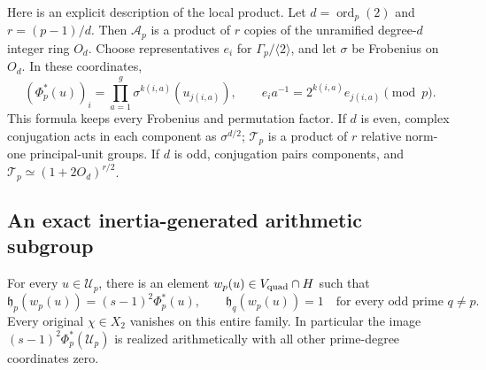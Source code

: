 Here is an explicit description of the local product.
Let \(d=\operatorname{ord}_p(2)\) and \(r=(p-1)/d\).
Then \(\mathcal A_p\) is a product of \(r\) copies of
the unramified degree-\(d\) integer ring \(O_d\).
Choose representatives \(e_i\) for
\(\Gamma_p/\langle2\rangle\), and let \(\sigma\)
be Frobenius on \(O_d\). In these coordinates,
\begin{equation}\label{eq:pdl-frobenius-products}
 (\Phi_p^*(u))_i
    =\prod_{a=1}^{g}\sigma^{k(i,a)}(u_{j(i,a)}),
 \qquad e_i a^{-1}=2^{k(i,a)}e_{j(i,a)}\pmod p.
\end{equation}
This formula keeps every Frobenius and permutation factor.
If \(d\) is even, complex conjugation acts in each
component as \(\sigma^{d/2}\); \(\mathcal T_p\) is a
product of \(r\) relative norm-one principal-unit groups.
If \(d\) is odd, conjugation pairs components, and
\(\mathcal T_p\simeq(1+2O_d)^{r/2}\).

\subsection{An exact inertia-generated arithmetic subgroup}

\begin{proposition}\label{prop:pdl-arithmetic-realization}
For every \(u\in\mathcal U_p\), there is an element
\(w_p(u)\in V_{\rm quad}\cap H\) such that
\begin{equation}\label{eq:pdl-witness-values}
 \mathfrak h_p(w_p(u))=(s-1)^2\Phi_p^*(u),\qquad
 \mathfrak h_q(w_p(u))=1
        \quad\text{for every odd prime }q\ne p.
\end{equation}
Every original \(\chi\in X_2\) vanishes on this
entire family. In particular the image
\((s-1)^2\Phi_p^*(\mathcal U_p)\) is realized
arithmetically with all other prime-degree coordinates zero.
\end{proposition}


